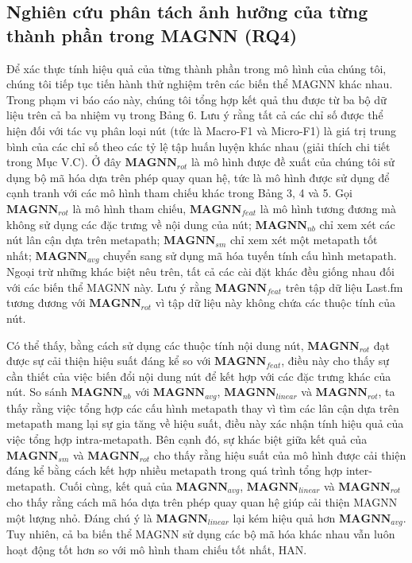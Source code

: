 \subsection{Nghiên cứu phân tách ảnh hưởng của từng thành phần trong MAGNN (RQ4)}
Để xác thực tính hiệu quả của từng thành phần trong mô hình của chúng tôi, chúng tôi tiếp tục tiến hành thử nghiệm trên các biến thể MAGNN khác nhau. Trong phạm vi báo cáo này, chúng tôi tổng hợp kết quả thu được từ ba bộ dữ liệu trên cả ba nhiệm vụ trong Bảng 6. Lưu ý rằng tất cả các chỉ số được thể hiện đối với tác vụ phân loại nút (tức là Macro-F1 và Micro-F1) là giá trị trung bình của các chỉ số theo các tỷ lệ tập huấn luyện khác nhau (giải thích chi tiết trong Mục V.C). Ở đây $\mathbf{MAGNN}_{rot}$ là mô hình được đề xuất của chúng tôi sử dụng bộ mã hóa dựa trên phép quay quan hệ, tức là mô hình được sử dụng để cạnh tranh với các mô hình tham chiếu khác trong Bảng 3, 4 và 5. Gọi $\mathbf{MAGNN}_{rot}$ là mô hình tham chiếu, $\mathbf{MAGNN}_{feat}$ là mô hình tương đương mà không sử dụng các đặc trưng về nội dung của nút; $\mathbf{MAGNN}_{nb}$ chỉ xem xét các nút lân cận dựa trên metapath; $\mathbf{MAGNN}_{sm}$ chỉ xem xét một metapath tốt nhất; $\mathbf{MAGNN}_{avg}$ chuyển sang sử dụng mã hóa tuyến tính cấu hình metapath. Ngoại trừ những khác biệt nêu trên, tất cả các cài đặt khác đều giống nhau đối với các biến thể MAGNN này. Lưu ý rằng $\mathbf{MAGNN}_{feat}$ trên tập dữ liệu Last.fm tương đương với $\mathbf{MAGNN}_{rot}$ vì tập dữ liệu này không chứa các thuộc tính của nút.

Có thể thấy, bằng cách sử dụng các thuộc tính nội dung nút, $\mathbf{MAGNN}_{rot}$ đạt được sự cải thiện hiệu suất đáng kể so với $\mathbf{MAGNN}_{feat}$, điều này cho thấy sự cần thiết của việc biến đổi nội dung nút để kết hợp với các đặc trưng khác của nút. So sánh $\mathbf{MAGNN}_{nb}$ với $\mathbf{MAGNN}_{avg}$, $\mathbf{MAGNN}_{linear}$ và $\mathbf{MAGNN}_{rot}$, ta thấy rằng việc tổng hợp các cấu hình metapath thay vì tìm các lân cận dựa trên metapath mang lại sự gia tăng về hiệu suất, điều này xác nhận tính hiệu quả của việc tổng hợp intra-metapath. Bên cạnh đó, sự khác biệt giữa kết quả của $\mathbf{MAGNN}_{sm}$ và $\mathbf{MAGNN}_{rot}$ cho thấy rằng hiệu suất của mô hình được cải thiện đáng kể bằng cách kết hợp nhiều metapath trong quá trình tổng hợp inter-metapath. Cuối cùng, kết quả của $\mathbf{MAGNN}_{avg}$, $\mathbf{MAGNN}_{linear}$ và $\mathbf{MAGNN}_{rot}$ cho thấy rằng cách mã hóa dựa trên phép quay quan hệ giúp cải thiện MAGNN một lượng nhỏ. Đáng chú ý là $\mathbf{MAGNN}_{linear}$ lại kém hiệu quả hơn $\mathbf{MAGNN}_{avg}$. Tuy nhiên, cả ba biến thể MAGNN sử dụng các bộ mã hóa khác nhau vẫn luôn hoạt động tốt hơn so với mô hình tham chiếu tốt nhất, HAN.

